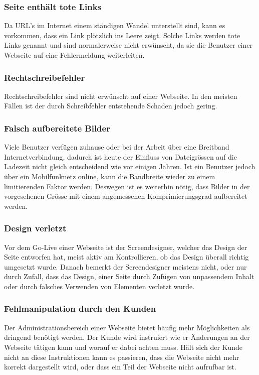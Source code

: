 \subsubsection{Seite enthält tote Links}
\label{ssub:seite_enthält_tote_links}
Da URL's im Internet einem ständigen Wandel unterstellt sind, kann es vorkommen, dass ein Link plötzlich ins Leere zeigt. Solche Links werden tote Links genannt und sind normalerweise nicht erwünscht, da sie die Benutzer einer Webseite auf eine Fehlermeldung weiterleiten.

\subsubsection{Rechtschreibefehler}
\label{ssub:rechtschreibefehler}
Rechtschreibefehler sind nicht erwünscht auf einer Webseite. In den meisten Fällen ist der durch Schreibfehler entstehende Schaden jedoch gering.

\subsubsection{Falsch aufbereitete Bilder}
\label{ssub:falsch_aufbereitete_bilder}
Viele Benutzer verfügen zuhause oder bei der Arbeit über eine Breitband Internetverbindung, dadurch ist heute der Einfluss von Dateigrössen auf die Ladezeit nicht gleich entscheidend wie vor einigen Jahren. Ist ein Benutzer jedoch über ein Mobilfunknetz online, kann die Bandbreite wieder zu einem limitierenden Faktor werden. Deswegen ist es weiterhin nötig, dass Bilder in der vorgesehenen Grösse mit einem angemessenen Komprimierungsgrad aufbereitet werden.

\subsubsection{Design verletzt}
\label{ssub:design_verletzt}
Vor dem Go-Live einer Webseite ist der Screendesigner, welcher das Design der Seite entworfen hat, meist aktiv am Kontrollieren, ob das Design überall richtig umgesetzt wurde. Danach bemerkt der Screendesigner meistens nicht, oder nur durch Zufall, dass das Design, einer Seite durch Zufügen von unpassendem Inhalt oder durch falsches Verwenden von Elementen verletzt wurde.

\subsubsection{Fehlmanipulation durch den Kunden}
\label{ssub:fehlmanipulationdurchdenkunden}
Der Administrationsbereich einer Webseite bietet häufig mehr Möglichkeiten als dringend benötigt werden. Der Kunde wird instruiert wie er Änderungen an der Webseite tätigen kann und worauf er dabei achten muss. Hält sich der Kunde nicht an diese Instruktionen kann es passieren, dass die Webseite nicht mehr korrekt dargestellt wird, oder dass ein Teil der Webseite nicht aufrufbar ist.

